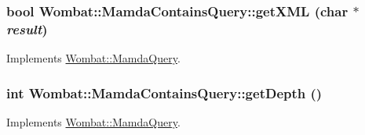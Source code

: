 \hypertarget{classWombat_1_1MamdaContainsQuery_ba25722c7f1d89440a932b102fd276b0}{
\subsubsection[getXML]{\setlength{\rightskip}{0pt plus 5cm}bool Wombat::Mamda\-Contains\-Query::get\-XML (char $\ast$ {\em result})}}
\label{classWombat_1_1MamdaContainsQuery_ba25722c7f1d89440a932b102fd276b0}




Implements \hyperlink{classWombat_1_1MamdaQuery_d5a4bbc29d9a752db0d07fa1e3aa2f25}{Wombat::Mamda\-Query}.\hypertarget{classWombat_1_1MamdaContainsQuery_4ba228d0a85b00d2cba7e162cd86951b}{
\subsubsection[getDepth]{\setlength{\rightskip}{0pt plus 5cm}int Wombat::Mamda\-Contains\-Query::get\-Depth ()}}
\label{classWombat_1_1MamdaContainsQuery_4ba228d0a85b00d2cba7e162cd86951b}




Implements \hyperlink{classWombat_1_1MamdaQuery_1658aee7db0fd2fce15c63293c428597}{Wombat::Mamda\-Query}.
